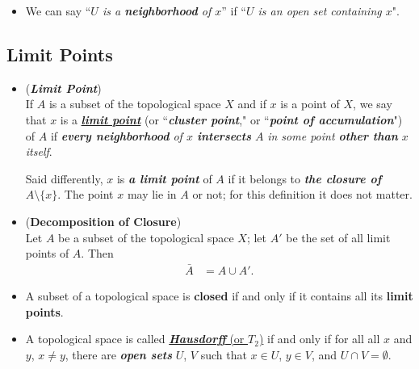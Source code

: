 \documentclass[11pt]{article}
\begin{document}
\begin{itemize}
\item \begin{remark}
We can say ``\emph{$U$ is a \textbf{neighborhood} of $x$}'' if ``\emph{$U$ is an open set containing $x$}".
\end{remark}
\end{itemize}
\subsection{Limit Points}
\begin{itemize}
\item \begin{definition} (\emph{\textbf{Limit Point}})\\
If $A$ is a subset of the topological space $X$ and if $x$ is a point of $X$, we say that $x$ is a \underline{\emph{\textbf{limit point}}} (or ``\emph{\textbf{cluster point}}," or ``\emph{\textbf{point of accumulation}}") of $A$ if \emph{\textbf{every neighborhood} of $x$ \textbf{intersects} $A$} \emph{in some point \textbf{other than} $x$ itself}. 

Said differently, $x$ is \emph{\textbf{a limit point}} of $A$ if it belongs to \emph{\textbf{the closure of $A \setminus \{x\}$}}. The point $x$ may lie in $A$ or not; for this definition it does not matter.
\end{definition}

\item \begin{theorem} (\textbf{Decomposition of Closure})\\
Let $A$ be a subset of the topological space $X$; let $A'$ be the set of all limit points of $A$. Then
\begin{align*}
\bar{A} &= A \cup A'.
\end{align*}
\end{theorem}

\item \begin{corollary}
A subset of a topological space is \textbf{closed} if and only if it contains all its \textbf{limit points}.
\end{corollary}

\item \begin{definition}
A topological space is called \underline{\emph{\textbf{Hausdorff}} (or $T_2$)} if and only if for all all $x$ and $y$, $x\neq y$, there are \emph{\textbf{open sets}}  $U$,  $V$ such that $x \in U$, $y \in V$, and $U \cap V = \emptyset$.
\end{definition}


\end{itemize}
\end{document}
